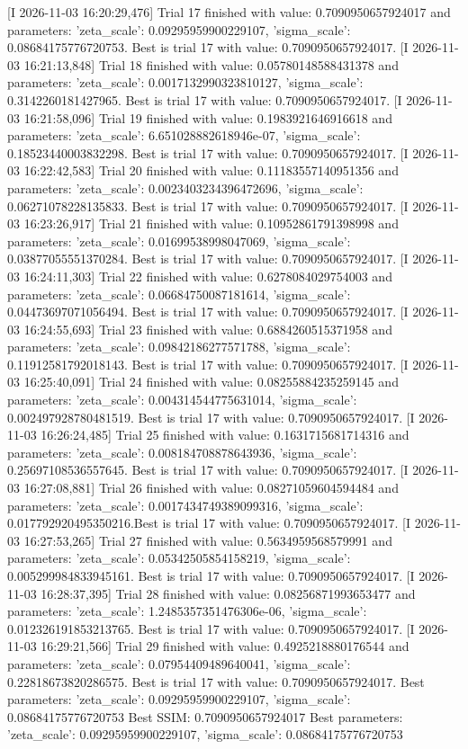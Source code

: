 [I 2026-11-03 16:20:29,476] Trial 17 finished with value: 0.7090950657924017 and parameters: {'zeta_scale': 0.09295959900229107, 'sigma_scale': 0.08684175776720753}. Best is trial 17 with value: 0.7090950657924017.
[I 2026-11-03 16:21:13,848] Trial 18 finished with value: 0.05780148588431378 and parameters: {'zeta_scale': 0.0017132990323810127, 'sigma_scale': 0.3142260181427965}. Best is trial 17 with value: 0.7090950657924017.
[I 2026-11-03 16:21:58,096] Trial 19 finished with value: 0.1983921646916618 and parameters: {'zeta_scale': 6.651028882618946e-07, 'sigma_scale': 0.18523440003832298}. Best is trial 17 with value: 0.7090950657924017.
[I 2026-11-03 16:22:42,583] Trial 20 finished with value: 0.11183557140951356 and parameters: {'zeta_scale': 0.0023403234396472696, 'sigma_scale': 0.06271078228135833}. Best is trial 17 with value: 0.7090950657924017.
[I 2026-11-03 16:23:26,917] Trial 21 finished with value: 0.10952861791398998 and parameters: {'zeta_scale': 0.01699538998047069, 'sigma_scale': 0.03877055551370284}. Best is trial 17 with value: 0.7090950657924017.
[I 2026-11-03 16:24:11,303] Trial 22 finished with value: 0.6278084029754003 and parameters: {'zeta_scale': 0.06684750087181614, 'sigma_scale': 0.04473697071056494}. Best is trial 17 with value: 0.7090950657924017.
[I 2026-11-03 16:24:55,693] Trial 23 finished with value: 0.6884260515371958 and parameters: {'zeta_scale': 0.09842186277571788, 'sigma_scale': 0.11912581792018143}. Best is trial 17 with value: 0.7090950657924017.
[I 2026-11-03 16:25:40,091] Trial 24 finished with value: 0.08255884235259145 and parameters: {'zeta_scale': 0.004314544775631014, 'sigma_scale': 0.002497928780481519}. Best is trial 17 with value: 0.7090950657924017.
[I 2026-11-03 16:26:24,485] Trial 25 finished with value: 0.1631715681714316 and parameters: {'zeta_scale': 0.008184708878643936, 'sigma_scale': 0.25697108536557645}. Best is trial 17 with value: 0.7090950657924017.
[I 2026-11-03 16:27:08,881] Trial 26 finished with value: 0.08271059604594484 and parameters: {'zeta_scale': 0.0017434749389099316, 'sigma_scale': 0.017792920495350216}.Best is trial 17 with value: 0.7090950657924017.
[I 2026-11-03 16:27:53,265] Trial 27 finished with value: 0.5634959568579991 and parameters: {'zeta_scale': 0.05342505854158219, 'sigma_scale': 0.005299984833945161}. Best is trial 17 with value: 0.7090950657924017.
[I 2026-11-03 16:28:37,395] Trial 28 finished with value: 0.08256871993653477 and parameters: {'zeta_scale': 1.2485357351476306e-06, 'sigma_scale': 0.012326191853213765}. Best is trial 17 with value: 0.7090950657924017.
[I 2026-11-03 16:29:21,566] Trial 29 finished with value: 0.4925218880176544 and parameters: {'zeta_scale': 0.07954409489640041, 'sigma_scale': 0.22818673820286575}. Best is trial 17 with value: 0.7090950657924017.
Best parameters:
{'zeta_scale': 0.09295959900229107, 'sigma_scale': 0.08684175776720753}
Best SSIM:
0.7090950657924017
Best parameters: {'zeta_scale': 0.09295959900229107, 'sigma_scale': 0.08684175776720753}


